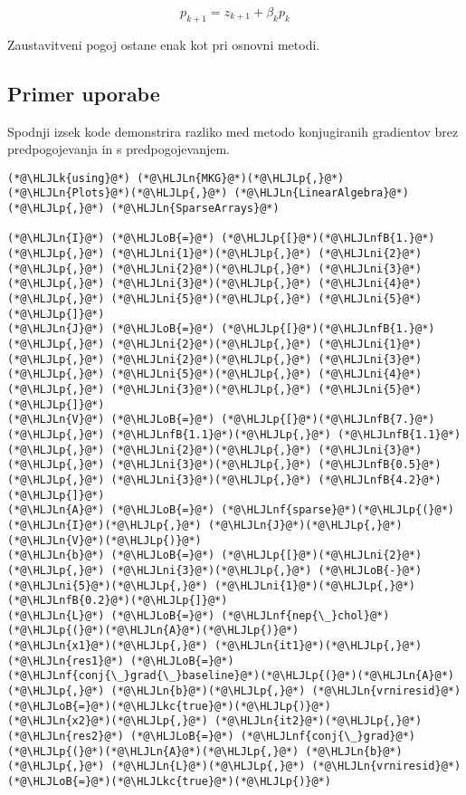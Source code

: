 \documentclass[12pt,a4paper]{article}
\newcommand{\HLJLk}[1]{\textcolor[RGB]{148,91,176}{\textbf{#1}}}
\newcommand{\HLJLkc}[1]{\textcolor[RGB]{59,151,46}{\textit{#1}}}
\newcommand{\HLJLn}[1]{#1}
\newcommand{\HLJLnf}[1]{\textcolor[RGB]{66,102,213}{#1}}
\newcommand{\HLJLnfB}[1]{\textcolor[RGB]{59,151,46}{#1}}
\newcommand{\HLJLni}[1]{\textcolor[RGB]{59,151,46}{#1}}
\newcommand{\HLJLoB}[1]{\textcolor[RGB]{102,102,102}{\textbf{#1}}}
\newcommand{\HLJLp}[1]{#1}
\begin{document}
\[
p_{k+1}=z_{k+1}+\beta_kp_k
\]

Zaustavitveni pogoj ostane enak kot pri osnovni metodi.


\subsection{Primer uporabe}
Spodnji izsek kode demonstrira razliko med metodo konjugiranih gradientov brez predpogojevanja in s predpogojevanjem. 


\begin{lstlisting}
(*@\HLJLk{using}@*) (*@\HLJLn{MKG}@*)(*@\HLJLp{,}@*) (*@\HLJLn{Plots}@*)(*@\HLJLp{,}@*) (*@\HLJLn{LinearAlgebra}@*)(*@\HLJLp{,}@*) (*@\HLJLn{SparseArrays}@*)

(*@\HLJLn{I}@*) (*@\HLJLoB{=}@*) (*@\HLJLp{[}@*)(*@\HLJLnfB{1.}@*)(*@\HLJLp{,}@*) (*@\HLJLni{1}@*)(*@\HLJLp{,}@*) (*@\HLJLni{2}@*)(*@\HLJLp{,}@*) (*@\HLJLni{2}@*)(*@\HLJLp{,}@*) (*@\HLJLni{3}@*)(*@\HLJLp{,}@*) (*@\HLJLni{3}@*)(*@\HLJLp{,}@*) (*@\HLJLni{4}@*)(*@\HLJLp{,}@*) (*@\HLJLni{5}@*)(*@\HLJLp{,}@*) (*@\HLJLni{5}@*)(*@\HLJLp{]}@*)
(*@\HLJLn{J}@*) (*@\HLJLoB{=}@*) (*@\HLJLp{[}@*)(*@\HLJLnfB{1.}@*)(*@\HLJLp{,}@*) (*@\HLJLni{2}@*)(*@\HLJLp{,}@*) (*@\HLJLni{1}@*)(*@\HLJLp{,}@*) (*@\HLJLni{2}@*)(*@\HLJLp{,}@*) (*@\HLJLni{3}@*)(*@\HLJLp{,}@*) (*@\HLJLni{5}@*)(*@\HLJLp{,}@*) (*@\HLJLni{4}@*)(*@\HLJLp{,}@*) (*@\HLJLni{3}@*)(*@\HLJLp{,}@*) (*@\HLJLni{5}@*)(*@\HLJLp{]}@*)
(*@\HLJLn{V}@*) (*@\HLJLoB{=}@*) (*@\HLJLp{[}@*)(*@\HLJLnfB{7.}@*)(*@\HLJLp{,}@*) (*@\HLJLnfB{1.1}@*)(*@\HLJLp{,}@*) (*@\HLJLnfB{1.1}@*)(*@\HLJLp{,}@*) (*@\HLJLni{2}@*)(*@\HLJLp{,}@*) (*@\HLJLni{3}@*)(*@\HLJLp{,}@*) (*@\HLJLni{3}@*)(*@\HLJLp{,}@*) (*@\HLJLnfB{0.5}@*)(*@\HLJLp{,}@*) (*@\HLJLni{3}@*)(*@\HLJLp{,}@*) (*@\HLJLnfB{4.2}@*)(*@\HLJLp{]}@*)
(*@\HLJLn{A}@*) (*@\HLJLoB{=}@*) (*@\HLJLnf{sparse}@*)(*@\HLJLp{(}@*)(*@\HLJLn{I}@*)(*@\HLJLp{,}@*) (*@\HLJLn{J}@*)(*@\HLJLp{,}@*) (*@\HLJLn{V}@*)(*@\HLJLp{)}@*)
(*@\HLJLn{b}@*) (*@\HLJLoB{=}@*) (*@\HLJLp{[}@*)(*@\HLJLni{2}@*)(*@\HLJLp{,}@*) (*@\HLJLni{3}@*)(*@\HLJLp{,}@*) (*@\HLJLoB{-}@*)(*@\HLJLni{5}@*)(*@\HLJLp{,}@*) (*@\HLJLni{1}@*)(*@\HLJLp{,}@*) (*@\HLJLnfB{0.2}@*)(*@\HLJLp{]}@*)
(*@\HLJLn{L}@*) (*@\HLJLoB{=}@*) (*@\HLJLnf{nep{\_}chol}@*)(*@\HLJLp{(}@*)(*@\HLJLn{A}@*)(*@\HLJLp{)}@*)
(*@\HLJLn{x1}@*)(*@\HLJLp{,}@*) (*@\HLJLn{it1}@*)(*@\HLJLp{,}@*) (*@\HLJLn{res1}@*) (*@\HLJLoB{=}@*) (*@\HLJLnf{conj{\_}grad{\_}baseline}@*)(*@\HLJLp{(}@*)(*@\HLJLn{A}@*)(*@\HLJLp{,}@*) (*@\HLJLn{b}@*)(*@\HLJLp{,}@*) (*@\HLJLn{vrniresid}@*)(*@\HLJLoB{=}@*)(*@\HLJLkc{true}@*)(*@\HLJLp{)}@*)
(*@\HLJLn{x2}@*)(*@\HLJLp{,}@*) (*@\HLJLn{it2}@*)(*@\HLJLp{,}@*) (*@\HLJLn{res2}@*) (*@\HLJLoB{=}@*) (*@\HLJLnf{conj{\_}grad}@*)(*@\HLJLp{(}@*)(*@\HLJLn{A}@*)(*@\HLJLp{,}@*) (*@\HLJLn{b}@*)(*@\HLJLp{,}@*) (*@\HLJLn{L}@*)(*@\HLJLp{,}@*) (*@\HLJLn{vrniresid}@*)(*@\HLJLoB{=}@*)(*@\HLJLkc{true}@*)(*@\HLJLp{)}@*)


\end{lstlisting}
\end{document}
